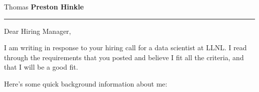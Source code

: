 \documentclass[letterpaper,11pt]{article}
\begin{document}
\begin{center}
\begin{Huge}
 Thomas \textbf{Preston Hinkle}
 \end{Huge}
\end{center}

\noindent\rule{20cm}{0.4pt}


Dear Hiring Manager,

I am writing in response to your hiring call for a data scientist at LLNL. I read through the requirements that you posted and believe I fit all the criteria, and that I will be a good fit.

Here's some quick background information about me:
\end{document}
